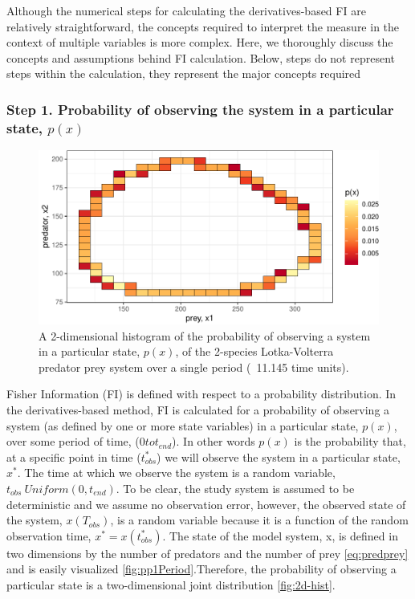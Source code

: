 \documentclass[12pt,twoside,openany]{reedthesis}
\begin{document}
Although the numerical steps for calculating the derivatives-based FI are relatively straightforward, the concepts required to interpret the measure in the context of multiple variables is more complex. Here, we thoroughly discuss the concepts and assumptions behind FI calculation. Below, steps do not represent steps within the calculation, they represent the major concepts required

\hypertarget{step-1.-probability-of-observing-the-system-in-a-particular-state-px}{%
\subsubsection{\texorpdfstring{\textbf{Step 1. Probability of observing the system in a particular state, \(p(x)\)}}{Step 1. Probability of observing the system in a particular state, p(x)}}\label{step-1.-probability-of-observing-the-system-in-a-particular-state-px}}
\begin{figure}
\includegraphics[width=0.85\linewidth]{_myDissertation_files/figure-latex/2D-hist-1} \caption{A 2-dimensional histogram of the probability of observing a system in a particular state, $p(x)$, of the 2-species Lotka-Volterra predator prey system over a single period (~11.145 time units).}\label{fig:2D-hist}
\end{figure}
Fisher Information (FI) is defined with respect to a probability distribution. In the derivatives-based method, FI is calculated for a probability of observing a system (as defined by one or more state variables) in a particular state, \(p(x)\), over some period of time, (\(0 to t_{end}\)). In other words \(p(x)\) is the probability that, at a specific point in time (\(t_{obs}^*\)) we will observe the system in a particular state, \(x^*\). The time at which we observe the system is a random variable, \(t_{obs} ~ Uniform(0,t_{end})\). To be clear, the study system is assumed to be deterministic and we assume no observation error, however, the observed state of the system, \(x(T_{obs})\), is a random variable because it is a function of the random observation time, \(x^*= x(t_{obs}^*)\). The state of the model system, x, is defined in two dimensions by the number of predators and the number of prey \eqref{eq:predprey} and is easily visualized \ref{fig:pp1Period}.Therefore, the probability of observing a particular state is a two-dimensional joint distribution \ref{fig:2d-hist}.
\end{document}
